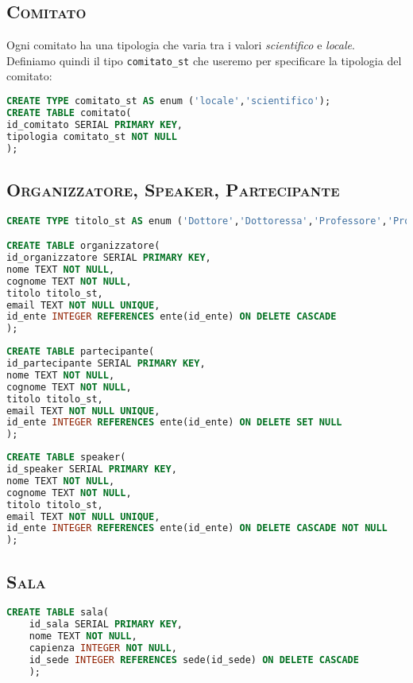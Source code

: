 \subsection{\textsc{Comitato}}
Ogni comitato ha una tipologia che varia tra i valori \textit{scientifico} e \textit{locale}. Definiamo quindi il tipo \texttt{comitato\_st} che useremo per specificare la tipologia del comitato:
\begin{lstlisting}[language=SQL,style=mystyle,caption={Tabella: Comitato}]
CREATE TYPE comitato_st AS enum ('locale','scientifico');
CREATE TABLE comitato(
id_comitato SERIAL PRIMARY KEY,
tipologia comitato_st NOT NULL
);
\end{lstlisting}
\subsection{\textsc{Organizzatore, Speaker, Partecipante}}
\begin{lstlisting}[language=SQL,style=mystyle,caption={Tabella: Organizzatore}]
CREATE TYPE titolo_st AS enum ('Dottore','Dottoressa','Professore','Professoressa','Assistente','Ricercatore','Ricercatrice','Ingegnere');

CREATE TABLE organizzatore(
id_organizzatore SERIAL PRIMARY KEY,
nome TEXT NOT NULL,
cognome TEXT NOT NULL,
titolo titolo_st,
email TEXT NOT NULL UNIQUE,
id_ente INTEGER REFERENCES ente(id_ente) ON DELETE CASCADE
);
\end{lstlisting}
\begin{lstlisting}[language=SQL,style=mystyle,caption={Tabella: Partecipante}]
CREATE TABLE partecipante(
id_partecipante SERIAL PRIMARY KEY,
nome TEXT NOT NULL,
cognome TEXT NOT NULL,
titolo titolo_st,
email TEXT NOT NULL UNIQUE, 
id_ente INTEGER REFERENCES ente(id_ente) ON DELETE SET NULL
);
\end{lstlisting}
\begin{lstlisting}[language=SQL,style=mystyle, caption={Tabella: Speaker}]
CREATE TABLE speaker(
id_speaker SERIAL PRIMARY KEY,
nome TEXT NOT NULL,
cognome TEXT NOT NULL,
titolo titolo_st,
email TEXT NOT NULL UNIQUE,
id_ente INTEGER REFERENCES ente(id_ente) ON DELETE CASCADE NOT NULL
);
\end{lstlisting}
\subsection{\textsc{Sala}}
\begin{lstlisting}[language=SQL,style=mystyle,caption={Tabella: Sala}]
	CREATE TABLE sala(
	id_sala SERIAL PRIMARY KEY,
	nome TEXT NOT NULL,
	capienza INTEGER NOT NULL,
	id_sede INTEGER REFERENCES sede(id_sede) ON DELETE CASCADE
	);
\end{lstlisting}
